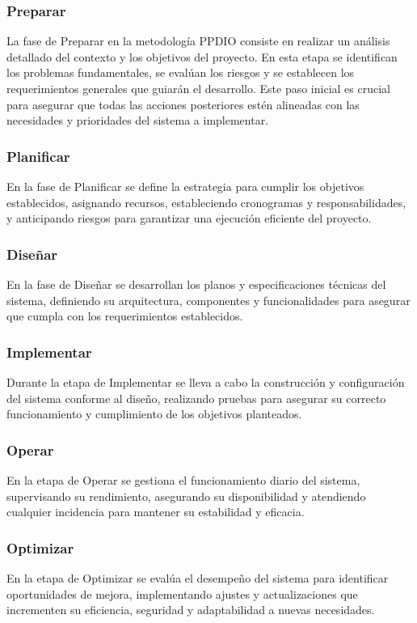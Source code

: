 \subsubsection{Preparar}
 La fase de Preparar en la metodología PPDIO consiste en realizar un análisis detallado del contexto y los objetivos del proyecto. En esta etapa se identifican los problemas fundamentales, se evalúan los riesgos y se establecen los requerimientos generales que guiarán el desarrollo. Este paso inicial es crucial para asegurar que todas las acciones posteriores estén alineadas con las necesidades y prioridades del sistema a implementar.
 
\subsubsection{Planificar}
En la fase de Planificar se define la estrategia para cumplir los objetivos establecidos, asignando recursos, estableciendo cronogramas y responsabilidades, y anticipando riesgos para garantizar una ejecución eficiente del proyecto.

\subsubsection{Diseñar}
En la fase de Diseñar se desarrollan los planos y especificaciones técnicas del sistema, definiendo su arquitectura, componentes y funcionalidades para asegurar que cumpla con los requerimientos establecidos.
\subsubsection{Implementar}
Durante la etapa de Implementar se lleva a cabo la construcción y configuración del sistema conforme al diseño, realizando pruebas para asegurar su correcto funcionamiento y cumplimiento de los objetivos planteados.

\subsubsection{Operar}
En la etapa de Operar se gestiona el funcionamiento diario del sistema, supervisando su rendimiento, asegurando su disponibilidad y atendiendo cualquier incidencia para mantener su estabilidad y eficacia.

\subsubsection{Optimizar}
En la etapa de Optimizar se evalúa el desempeño del sistema para identificar oportunidades de mejora, implementando ajustes y actualizaciones que incrementen su eficiencia, seguridad y adaptabilidad a nuevas necesidades.